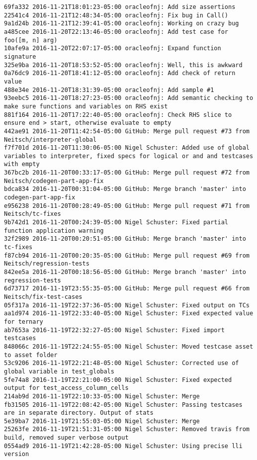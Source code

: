 \begin{lstlisting}
69fa332 2016-11-21T18:01:23-05:00 oracleofnj: Add size assertions
22541c4 2016-11-21T12:48:34-05:00 oracleofnj: Fix bug in Call()
9a1d24b 2016-11-21T12:39:41-05:00 oracleofnj: Working on crazy bug
a485cee 2016-11-20T22:13:46-05:00 oracleofnj: Add test case for foo([m, n] arg)
10afe9a 2016-11-20T22:07:17-05:00 oracleofnj: Expand function signature
325e9ba 2016-11-20T18:53:52-05:00 oracleofnj: Well, this is awkward
0a76dc9 2016-11-20T18:41:12-05:00 oracleofnj: Add check of return value
488e34e 2016-11-20T18:31:39-05:00 oracleofnj: Add sample #1
93eebc5 2016-11-20T18:27:23-05:00 oracleofnj: Add semantic checking to make sure functions and variables on RHS exist
881f164 2016-11-20T17:22:40-05:00 oracleofnj: Check RHS slice to ensure end > start, otherwise evaluate to empty
442ae91 2016-11-20T11:42:54-05:00 GitHub: Merge pull request #73 from Neitsch/interpreter-global
f7f701d 2016-11-20T11:30:06-05:00 Nigel Schuster: Added use of global variables to interpreter, fixed specs for logical or and and testcases with empty
367bc2b 2016-11-20T00:33:17-05:00 GitHub: Merge pull request #72 from Neitsch/codegen-part-app-fix
bdca834 2016-11-20T00:31:04-05:00 GitHub: Merge branch 'master' into codegen-part-app-fix
e956238 2016-11-20T00:28:49-05:00 GitHub: Merge pull request #71 from Neitsch/tc-fixes
9b742d1 2016-11-20T00:24:39-05:00 Nigel Schuster: Fixed partial function application warning
32f2989 2016-11-20T00:20:51-05:00 GitHub: Merge branch 'master' into tc-fixes
f87cb94 2016-11-20T00:20:35-05:00 GitHub: Merge pull request #69 from Neitsch/regression-tests
842ee5a 2016-11-20T00:18:56-05:00 GitHub: Merge branch 'master' into regression-tests
6d73717 2016-11-19T23:55:35-05:00 GitHub: Merge pull request #66 from Neitsch/fix-test-cases
05f317a 2016-11-19T22:37:36-05:00 Nigel Schuster: Fixed output on TCs
aa1d974 2016-11-19T22:33:40-05:00 Nigel Schuster: Fixed expected value for ternary
ab7653a 2016-11-19T22:32:27-05:00 Nigel Schuster: Fixed import testcases
848066c 2016-11-19T22:24:55-05:00 Nigel Schuster: Moved testcase asset to asset folder
53c9206 2016-11-19T22:21:48-05:00 Nigel Schuster: Corrected use of global variable in test_globals
5fe74a8 2016-11-19T22:21:00-05:00 Nigel Schuster: Fixed expected output for test_access_column_cells
214ab9d 2016-11-19T22:10:33-05:00 Nigel Schuster: Merge
fb31505 2016-11-19T22:08:42-05:00 Nigel Schuster: Passing testcases are in separate directory. Output of stats
5e39ba7 2016-11-19T21:55:03-05:00 Nigel Schuster: Merge
25263fe 2016-11-19T21:51:31-05:00 Nigel Schuster: Removed travis from build, removed super verbose output
0554ad9 2016-11-19T21:42:28-05:00 Nigel Schuster: Using precise lli version

\end{lstlisting}
